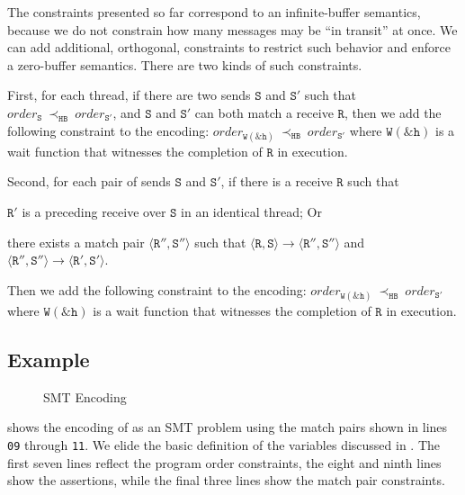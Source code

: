The constraints presented so far correspond to an infinite-buffer
semantics, because we do not constrain how many messages may be ``in
transit'' at once. We can add additional, orthogonal, constraints to
restrict such behavior and enforce a zero-buffer semantics. There are
two kinds of such constraints.

First, for each thread, if there are two sends $\mathtt{S}$ and
$\mathtt{S'}$ such that
$\mathit{order}_\mathtt{S}\ \mathrm{\prec_\mathtt{HB}}\ \mathit{order}_\mathtt{S'}$,
and $\mathtt{S}$ and $\mathtt{S'}$ can both match a receive
$\mathtt{R}$, then we add the following constraint to the encoding:
$\mathit{order}_{\mathtt{W(\&h)}}\ \mathrm{\prec_{\mathtt{HB}}}\ \mathit{order}_{\mathtt{S'}}$
where $\mathtt{W(\&h)}$ is a wait function that witnesses the
completion of $\mathtt{R}$ in execution.

Second, for each pair of sends $\mathtt{S}$ and $\mathtt{S'}$, if
there is a receive $\mathtt{R}$ such that

\begin{compactenum}
\item $\mathtt{R'}$ is a preceding receive over $\mathtt{S}$ in an
  identical thread; Or

\item there exists a match pair $\langle\mathtt{R''},
  \mathtt{S''}\rangle$ such that $\langle\mathtt{R}, \mathtt{S}\rangle
  \rightarrow \langle\mathtt{R''}, \mathtt{S''}\rangle$ and
  $\langle\mathtt{R''}, \mathtt{S''}\rangle \rightarrow
  \langle\mathtt{R'}, \mathtt{S'}\rangle$.
\end{compactenum}

Then we add the following constraint to the encoding:
$\mathit{order}_{\mathtt{W(\&h)}}\ \mathrm{\prec_{\mathtt{HB}}}\ \mathit{order}_{\mathtt{S'}}$
where $\mathtt{W(\&h)}$ is a wait function that witnesses the
completion of $\mathtt{R}$ in execution.

\subsection{Example}

\begin{figure}[t]
\begin{center}
\usebox{\boxSMTc}
\end{center}
\caption{SMT Encoding} \label{fig:smt-encode}
\end{figure}

 shows the encoding of  as an
SMT problem using the match pairs shown in lines \texttt{09} through
\texttt{11}. We elide the basic definition of the variables discussed
in . The first seven lines reflect the program
order constraints, the eight and ninth lines show the assertions,
while the final three lines show the match pair constraints.

